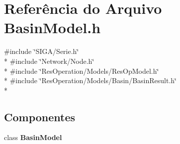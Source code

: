 \section{Referência do Arquivo Basin\+Model.\+h}
\label{_basin_model_8h}
{\ttfamily \#include \char`\"{}S\+I\+G\+A/\+Serie.\+h\char`\"{}}\\*
{\ttfamily \#include \char`\"{}Network/\+Node.\+h\char`\"{}}\\*
{\ttfamily \#include \char`\"{}Res\+Operation/\+Models/\+Res\+Op\+Model.\+h\char`\"{}}\\*
{\ttfamily \#include \char`\"{}Res\+Operation/\+Models/\+Basin/\+Basin\+Result.\+h\char`\"{}}\\*
\subsection*{Componentes}
\begin{DoxyCompactItemize}
\item 
class {\bf Basin\+Model}
\end{DoxyCompactItemize}
